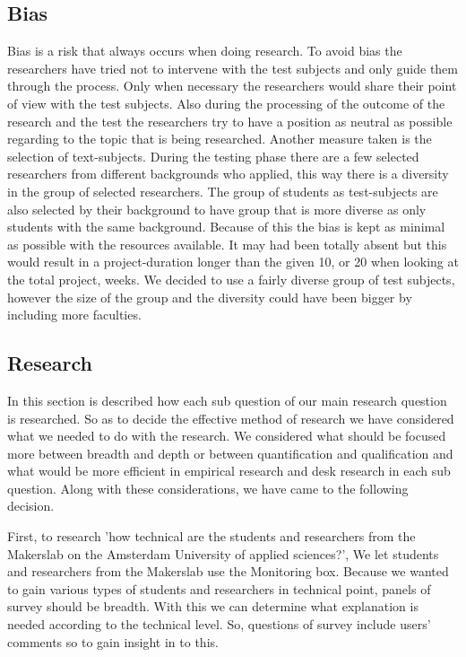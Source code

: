 \documentclass[conference]{IEEEtran}
\begin{document}
		\subsection{Bias}
			Bias is a risk that always occurs when doing research. To avoid bias the researchers have tried not to intervene with the test subjects and only guide them through the process. Only when necessary the researchers would share their point of view with the test subjects. Also during the processing of the outcome of the research and the test the researchers try to have a position as neutral as possible regarding to the topic that is being researched. Another measure taken is the selection of text-subjects. During the testing phase there are a few selected researchers from different backgrounds who applied, this way there is a diversity in the group of selected researchers. The group of students as test-subjects are also selected by their background to have group that is more diverse as only students with the same background. Because of this the bias is kept as minimal as possible with the resources available. It may had been totally absent but this would result in a project-duration longer than the given 10, or 20 when looking at the total project, weeks. We decided to use a fairly diverse group of test subjects, however the size of the group and the diversity could have been bigger by including more faculties.
		\subsection{Research}
			In this section is described how each sub question of our main research question is researched. So as to decide the effective method of research we have considered what we needed to do with the research. We considered what should be focused more between breadth and depth or between quantification and qualification and what would be more efficient in empirical research and desk research in each sub question. Along with these considerations, we have came to the following decision. 

			First, to research 'how technical are the students and researchers from the Makerslab on the Amsterdam University of applied sciences?', We let students and researchers from the Makerslab use the Monitoring box. Because we wanted to gain various types of students and researchers in technical point, panels of survey should be breadth. With this we can determine what explanation is needed according to the technical level. So, questions of survey include users' comments so to gain insight in to this. 
\end{document}
